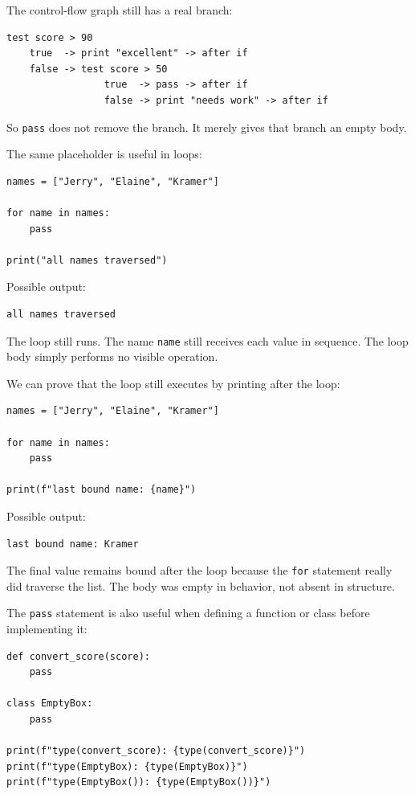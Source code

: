 The control-flow graph still has a real branch:

\begin{verbatim}
test score > 90
    true  -> print "excellent" -> after if
    false -> test score > 50
                 true  -> pass -> after if
                 false -> print "needs work" -> after if
\end{verbatim}

So \texttt{pass} does not remove the branch. It merely gives that branch an empty body.

The same placeholder is useful in loops:

\begin{verbatim}
names = ["Jerry", "Elaine", "Kramer"]

for name in names:
    pass

print("all names traversed")
\end{verbatim}

Possible output:

\begin{verbatim}
all names traversed
\end{verbatim}

The loop still runs. The name \texttt{name} still receives each value in sequence. The loop body simply performs no visible operation.

We can prove that the loop still executes by printing after the loop:

\begin{verbatim}
names = ["Jerry", "Elaine", "Kramer"]

for name in names:
    pass

print(f"last bound name: {name}")
\end{verbatim}

Possible output:

\begin{verbatim}
last bound name: Kramer
\end{verbatim}

The final value remains bound after the loop because the \texttt{for} statement really did traverse the list. The body was empty in behavior, not absent in structure.

The \texttt{pass} statement is also useful when defining a function or class before implementing it:

\begin{verbatim}
def convert_score(score):
    pass

class EmptyBox:
    pass

print(f"type(convert_score): {type(convert_score)}")
print(f"type(EmptyBox): {type(EmptyBox)}")
print(f"type(EmptyBox()): {type(EmptyBox())}")
\end{verbatim}

